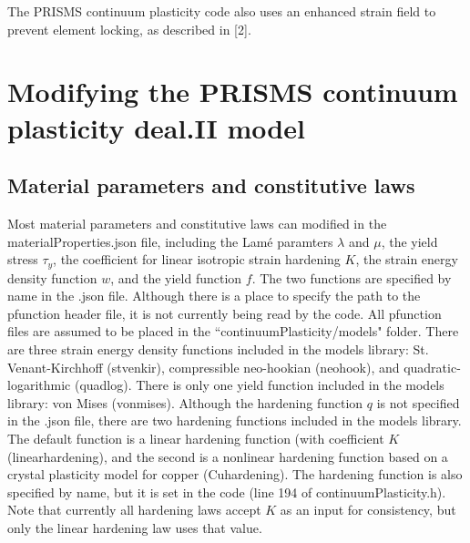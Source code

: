 \documentclass[10pt]{article}
\begin{document}
The PRISMS continuum plasticity code also uses an enhanced strain field to prevent element locking, as described in [2].

\pagebreak

\section{Modifying the PRISMS continuum plasticity deal.II model}

\subsection{Material parameters and constitutive laws}
Most material parameters and constitutive laws can modified in the materialProperties.json file, including the Lam\'e paramters $\lambda$ and $\mu$, the yield stress $\tau_y$, the coefficient for linear isotropic strain hardening $K$, the strain energy density function $w$, and the yield function $f$. The two functions are specified by name in the .json file. Although there is a place to specify the path to the pfunction header file, it is not currently being read by the code. All pfunction files are assumed to be placed in the ``continuumPlasticity/models" folder. There are three strain energy density functions included in the models library: St. Venant-Kirchhoff (stvenkir), compressible neo-hookian (neohook), and quadratic-logarithmic (quadlog). There is only one yield function included in the models library: von Mises (von\textunderscore mises). Although the hardening function $q$ is not specified in the .json file, there are two hardening functions included in the models library. The default function is a linear hardening function (with coefficient $K$ (linear\textunderscore hardening), and the second is a nonlinear hardening function based on a crystal plasticity model for copper (Cu\textunderscore hardening). The hardening function is also specified by name, but it is set in the code (line 194 of continuumPlasticity.h). Note that currently all hardening laws accept $K$ as an input for consistency, but only the linear hardening law uses that value.
\end{document}
